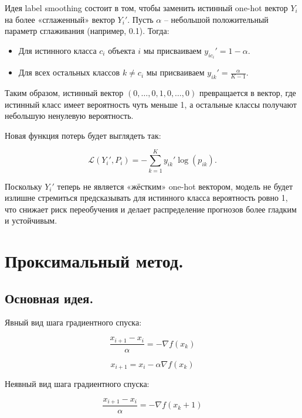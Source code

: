 \begin{solution}
    Идея label smoothing состоит в том, чтобы заменить истинный one-hot вектор $Y_i$ на более «сглаженный» вектор $Y_i'$. Пусть $\alpha$ – небольшой положительный параметр сглаживания (например, 0.1). Тогда:

    \begin{itemize}
        \item Для истинного класса $c_i$ объекта $i$ мы присваиваем $y_{ic_i}' = 1 - \alpha$.
        \item Для всех остальных классов $k \neq c_i$ мы присваиваем $y_{ik}' = \frac{\alpha}{K-1}$.
    \end{itemize}

    Таким образом, истинный вектор $(0,\dots,0,1,0,\dots,0)$ превращается в вектор, где истинный класс имеет вероятность чуть меньше 1, а остальные классы получают небольшую ненулевую вероятность.

    Новая функция потерь будет выглядеть так:

    $$
        \mathcal{L}(Y_i', P_i) = -\sum_{k=1}^K y_{ik}' \log(p_{ik}).
    $$

    Поскольку $Y_i'$ теперь не является «жёстким» one-hot вектором, модель не будет излишне стремиться предсказывать для истинного класса вероятность ровно 1, что снижает риск переобучения и делает распределение прогнозов более гладким и устойчивым.
\end{solution}


\section*{Проксимальный метод.}

\subsection*{Основная идея.}

Явный вид шага градиентного спуска:

\begin{equation}
    \frac{x_{i+1}-x_i}\alpha=-\nabla f(x_k)
\end{equation}

\begin{equation}
    x_{i+1}=x_i-\alpha\nabla f(x_k)
\end{equation}

Неявный вид шага градиентного спуска:

\begin{equation}
    \frac{x_{i+1}-x_i}\alpha=-\nabla f(x_k+1)
\end{equation}

